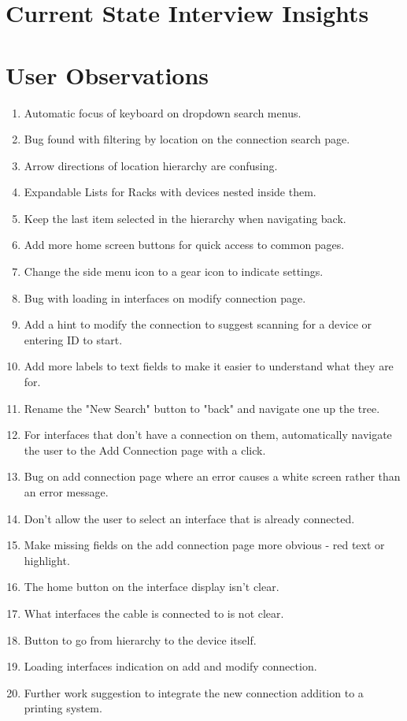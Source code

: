 \documentclass [11pt,a4paper]{article}
\begin{document}
\section{Current State Interview Insights}
\label{sec:current_state_interview_takeaways}


\section{User Observations }
\label{sec:appendix_observations}
\begin{enumerate}
    \item Automatic focus of keyboard on dropdown search menus.
    \item Bug found with filtering by location on the connection search page.
    \item Arrow directions of location hierarchy are confusing.
    \item Expandable Lists for Racks with devices nested inside them.
    \item Keep the last item selected in the hierarchy when navigating back.
    \item Add more home screen buttons for quick access to common pages.
    \item Change the side menu icon to a gear icon to indicate settings.
    \item Bug with loading in interfaces on modify connection page.
    \item Add a hint to modify the connection to suggest scanning for a device or entering ID to start.
    \item Add more labels to text fields to make it easier to understand what they are for.
    \item Rename the "New Search" button to "back" and navigate one up the tree. 
    \item For interfaces that don't have a connection on them, automatically navigate the user to the Add Connection page with a click.
    \item Bug on add connection page where an error causes a white screen rather than an error message.
    \item Don't allow the user to select an interface that is already connected.
    \item Make missing fields on the add connection page more obvious - red text or highlight.
    \item The home button on the interface display isn't clear. 
    \item What interfaces the cable is connected to is not clear.
    \item Button to go from hierarchy to the device itself. 
    \item Loading interfaces indication on add and modify connection.
    \item Further work suggestion to integrate the new connection addition to a printing system.
\end{enumerate}
\end{document}
